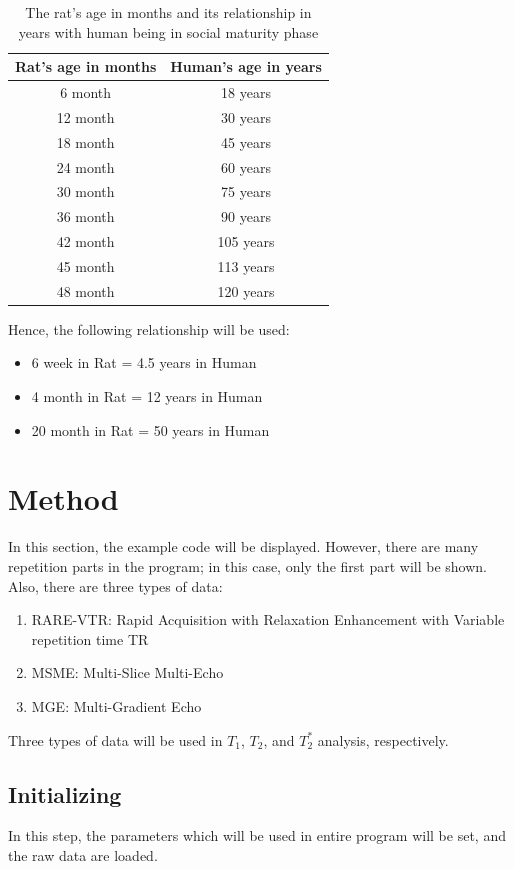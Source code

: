 \documentclass[10pt, a4paper]{article}
\begin{document}
				\begin{table}[htbp]
					\centering
					\caption{The rat's age in months and its relationship in years with human being in social maturity phase \protect \cite{ref:dev2}}
					\label{tb:dev}
					\begin{tabular}{cc}
						Rat's age in months & Human's age in years \\ \hline
						6 month & 18 years \\
						12 month & 30 years \\
						18 month & 45 years \\
						24 month & 60 years \\
						30 month & 75 years \\
						36 month & 90 years \\
						42 month & 105 years \\
						45 month & 113 years \\
						48 month & 120 years \\
					\end{tabular}
				\end{table}
			
				Hence, the following relationship will be used:
				\begin{itemize}
					\item 6 week in Rat = 4.5 years in Human
					\item 4 month in Rat = 12 years in Human
					\item 20 month in Rat = 50 years in Human
				\end{itemize}
	
	\section{Method}
		In this section, the example code will be displayed. However, there are many repetition parts in the program; in this case, only the first part will be shown. Also, there are three types of data:
		\begin{enumerate}
			\item RARE-VTR: Rapid Acquisition with Relaxation Enhancement with Variable repetition time TR
			\item MSME: Multi-Slice Multi-Echo
			\item MGE: Multi-Gradient Echo
		\end{enumerate}
		Three types of data will be used in $T_1$, $T_2$, and $T_2^*$ analysis, respectively.
	
		\subsection{Initializing}
			In this step, the parameters which will be used in entire program will be set, and the raw data are loaded. 
			
\end{document}
